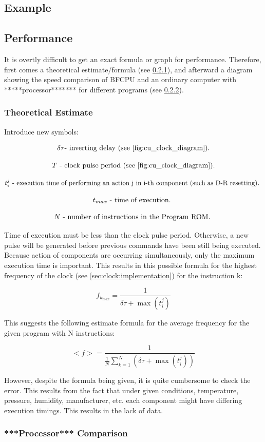 \subsection{Example} \label{sec:control_unit:example}



\subsection{Performance} \label{sec:control_unit:performance}
It is overtly difficult to get an exact formula or graph for performance. Therefore, first comes a theoretical estimate/formula (see \ref{sec:control_unit:performance:theretical_estimate}), and afterward a diagram showing the speed comparison of BFCPU and an ordinary computer with *****processor******* for different programs {(see \ref{sec:control_unit:performance:comparison})}. 

\subsubsection{Theoretical Estimate} \label{sec:control_unit:performance:theretical_estimate}
Introduce new symbols:

\[\delta \tau \textmd{- inverting delay (see \ref{fig:cu_clock_diagram}).}\]

\[T \textmd{ - clock pulse period (see \ref{fig:cu_clock_diagram}).}\]

\[t_{i}^{j} \textmd{ - execution time of performing an action j in i-th component (such as D-R resetting). } \]

\[t_{max} \textmd{ - time of execution. }\]

\[N \textmd{ - number of instructions in the Program ROM. }\]

Time of execution must be less than the clock pulse period. Otherwise, a new pulse will be generated before previous commands have been still being executed. Because action of components are occurring simultaneously, only the maximum execution time is important. This results in this possible formula for the highest frequency of the clock (see \ref{sec:clock:implementation}) for the instruction k:

\[ f_{k_{max}} = \frac{1}{\delta \tau + \max{(t_{i}^{j})}} \]

This suggests the following estimate formula for the average frequency for the given program with N instructions: 

\[ <f> = \frac{1}{\frac{1}{N} \sum_{k = 1}^{N} (\delta \tau + \max{(t_{i}^{j})})} \]

However, despite the formula being given, it is quite cumbersome to check the error. This results from the fact that under given conditions, temperature, pressure, humidity, manufacturer, etc. each component might have differing execution timings. This results in the lack of data.


\subsubsection{***Processor*** Comparison} \label{sec:control_unit:performance:comparison}




